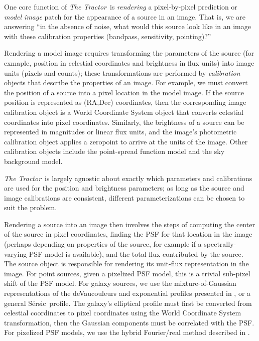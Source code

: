 \documentclass[modern, linenumbers]{aastex631}
\newcommand{\thetractor}{\emph{The Tractor}}
\newcommand{\sersic}{S\'ersic}
\begin{document}
One core function of \thetractor\ is \emph{rendering} a
pixel-by-pixel prediction or \emph{model image} patch for the appearance of a source in
an image.  That is, we are answering ``in the absence of noise, what would this source look like in an image with these calibration properties (bandpass, sensitivity, pointing)?''

Rendering a model image requires transforming the parameters of the source (for exmaple, position in celestial coordinates and brightness in flux units) into
image units (pixels and counts); these transformations are performed
by \emph{calibration} objects that describe the properties of an image.
For example, we must convert the position of a source into a pixel
location in the model image.  If the source position is represented as
(RA,Dec) coordinates, then the corresponding image calibration object
is a World Coordinate System object that converts celestial
coordinates into pixel coordinates.  Similarly, the brightness of a
source can be represented in magnitudes or linear flux units, and the image's photometric calibration object applies a zeropoint to
arrive at the units of the image.  Other calibration objects
include the point-spread function model and the sky background model.

\thetractor\ is largely agnostic about exactly which parameters and
calibrations are used for the position and brightness parameters; as
long as the source and image calibrations are consistent, different
parameterizations can be chosen to suit the problem.


Rendering a source into an image then involves the steps of computing
the center of the source in pixel coordinates, finding the PSF for
that location in the image (perhaps depending on properties of the
source, for example if a spectrally-varying PSF model is available),
and the total flux contributed by the source.  The source
object is responsible for rendering its unit-flux representation in the image.  For point sources, given a pixelized PSF model, this is a trivial sub-pixel shift of the PSF model.  For galaxy sources, we use the mixture-of-Gaussian representations of the deVaucouleurs and exponential profiles presented in \cite{gaussiangalaxies}, or a general \sersic\ profile.
The galaxy's elliptical profile must first be converted from celestial coordinates to pixel coordinates using the World Coordinate System transformation, then the Gaussian components must be correlated with the PSF.  For pixelized PSF models, we use the hybrid Fourier/real method described in \cite{galaxyfourier}.
\end{document}
